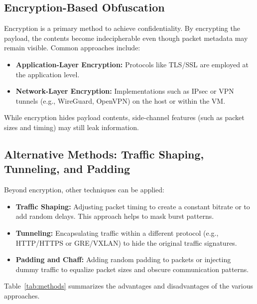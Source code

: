 \documentclass{article}
\begin{document}
\subsection{Encryption-Based Obfuscation}
Encryption is a primary method to achieve confidentiality. By encrypting the payload, the contents become indecipherable even though packet metadata may remain visible. Common approaches include:
\begin{itemize}[noitemsep]
    \item \textbf{Application-Layer Encryption:} Protocols like TLS/SSL are employed at the application level.
    \item \textbf{Network-Layer Encryption:} Implementations such as IPsec or VPN tunnels (e.g., WireGuard, OpenVPN) on the host or within the VM.
\end{itemize}
While encryption hides payload contents, side-channel features (such as packet sizes and timing) may still leak information.

\subsection{Alternative Methods: Traffic Shaping, Tunneling, and Padding}
Beyond encryption, other techniques can be applied:
\begin{itemize}[noitemsep]
    \item \textbf{Traffic Shaping:} Adjusting packet timing to create a constant bitrate or to add random delays. This approach helps to mask burst patterns.
    \item \textbf{Tunneling:} Encapsulating traffic within a different protocol (e.g., HTTP/HTTPS or GRE/VXLAN) to hide the original traffic signatures.
    \item \textbf{Padding and Chaff:} Adding random padding to packets or injecting dummy traffic to equalize packet sizes and obscure communication patterns.
\end{itemize}

Table~\ref{tab:methods} summarizes the advantages and disadvantages of the various approaches.
\end{document}
